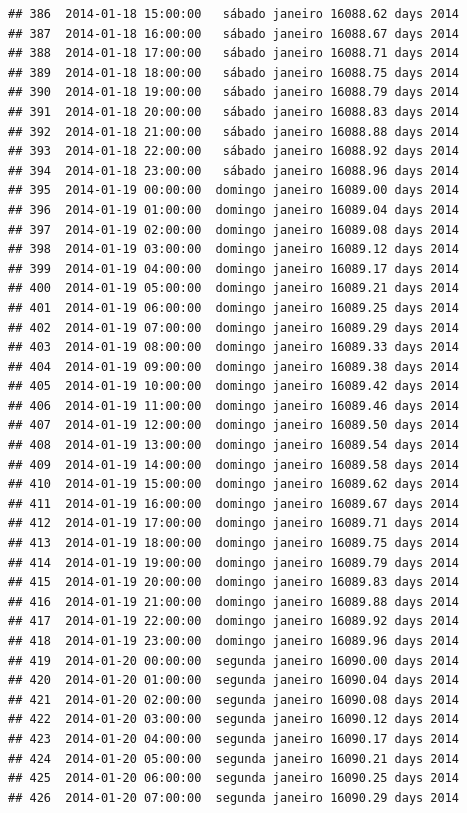 \documentclass[]{book}
\begin{document}
\begin{verbatim}
## 386  2014-01-18 15:00:00   sábado janeiro 16088.62 days 2014
## 387  2014-01-18 16:00:00   sábado janeiro 16088.67 days 2014
## 388  2014-01-18 17:00:00   sábado janeiro 16088.71 days 2014
## 389  2014-01-18 18:00:00   sábado janeiro 16088.75 days 2014
## 390  2014-01-18 19:00:00   sábado janeiro 16088.79 days 2014
## 391  2014-01-18 20:00:00   sábado janeiro 16088.83 days 2014
## 392  2014-01-18 21:00:00   sábado janeiro 16088.88 days 2014
## 393  2014-01-18 22:00:00   sábado janeiro 16088.92 days 2014
## 394  2014-01-18 23:00:00   sábado janeiro 16088.96 days 2014
## 395  2014-01-19 00:00:00  domingo janeiro 16089.00 days 2014
## 396  2014-01-19 01:00:00  domingo janeiro 16089.04 days 2014
## 397  2014-01-19 02:00:00  domingo janeiro 16089.08 days 2014
## 398  2014-01-19 03:00:00  domingo janeiro 16089.12 days 2014
## 399  2014-01-19 04:00:00  domingo janeiro 16089.17 days 2014
## 400  2014-01-19 05:00:00  domingo janeiro 16089.21 days 2014
## 401  2014-01-19 06:00:00  domingo janeiro 16089.25 days 2014
## 402  2014-01-19 07:00:00  domingo janeiro 16089.29 days 2014
## 403  2014-01-19 08:00:00  domingo janeiro 16089.33 days 2014
## 404  2014-01-19 09:00:00  domingo janeiro 16089.38 days 2014
## 405  2014-01-19 10:00:00  domingo janeiro 16089.42 days 2014
## 406  2014-01-19 11:00:00  domingo janeiro 16089.46 days 2014
## 407  2014-01-19 12:00:00  domingo janeiro 16089.50 days 2014
## 408  2014-01-19 13:00:00  domingo janeiro 16089.54 days 2014
## 409  2014-01-19 14:00:00  domingo janeiro 16089.58 days 2014
## 410  2014-01-19 15:00:00  domingo janeiro 16089.62 days 2014
## 411  2014-01-19 16:00:00  domingo janeiro 16089.67 days 2014
## 412  2014-01-19 17:00:00  domingo janeiro 16089.71 days 2014
## 413  2014-01-19 18:00:00  domingo janeiro 16089.75 days 2014
## 414  2014-01-19 19:00:00  domingo janeiro 16089.79 days 2014
## 415  2014-01-19 20:00:00  domingo janeiro 16089.83 days 2014
## 416  2014-01-19 21:00:00  domingo janeiro 16089.88 days 2014
## 417  2014-01-19 22:00:00  domingo janeiro 16089.92 days 2014
## 418  2014-01-19 23:00:00  domingo janeiro 16089.96 days 2014
## 419  2014-01-20 00:00:00  segunda janeiro 16090.00 days 2014
## 420  2014-01-20 01:00:00  segunda janeiro 16090.04 days 2014
## 421  2014-01-20 02:00:00  segunda janeiro 16090.08 days 2014
## 422  2014-01-20 03:00:00  segunda janeiro 16090.12 days 2014
## 423  2014-01-20 04:00:00  segunda janeiro 16090.17 days 2014
## 424  2014-01-20 05:00:00  segunda janeiro 16090.21 days 2014
## 425  2014-01-20 06:00:00  segunda janeiro 16090.25 days 2014
## 426  2014-01-20 07:00:00  segunda janeiro 16090.29 days 2014

\end{verbatim}
\end{document}
